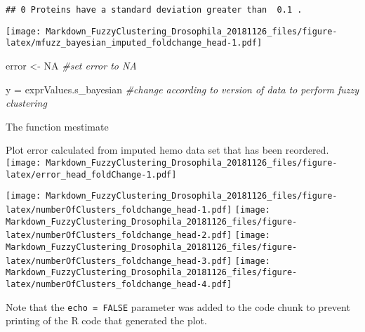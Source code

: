 \documentclass[]{article}
\newenvironment{Shaded}{\begin{snugshade}}{\end{snugshade}}
\newcommand{\KeywordTok}[1]{\textcolor[rgb]{0.13,0.29,0.53}{\textbf{#1}}}
\newcommand{\DataTypeTok}[1]{\textcolor[rgb]{0.13,0.29,0.53}{#1}}
\newcommand{\DecValTok}[1]{\textcolor[rgb]{0.00,0.00,0.81}{#1}}
\newcommand{\StringTok}[1]{\textcolor[rgb]{0.31,0.60,0.02}{#1}}
\newcommand{\CommentTok}[1]{\textcolor[rgb]{0.56,0.35,0.01}{\textit{#1}}}
\newcommand{\OtherTok}[1]{\textcolor[rgb]{0.56,0.35,0.01}{#1}}
\newcommand{\ControlFlowTok}[1]{\textcolor[rgb]{0.13,0.29,0.53}{\textbf{#1}}}
\newcommand{\OperatorTok}[1]{\textcolor[rgb]{0.81,0.36,0.00}{\textbf{#1}}}
\newcommand{\NormalTok}[1]{#1}
\begin{document}
\begin{verbatim}
## 0 Proteins have a standard deviation greater than  0.1 .
\end{verbatim}

\texttt{[image: Markdown\_FuzzyClustering\_Drosophila\_20181126\_files/figure-latex/mfuzz\_bayesian\_imputed\_foldchange\_head-1.pdf]}

\begin{Shaded}
\begin{Highlighting}[]
\NormalTok{error <-}\StringTok{ }\OtherTok{NA} \CommentTok{#set error to NA}

\NormalTok{y =}\StringTok{ }\NormalTok{exprValues.s_bayesian }\CommentTok{#change according to version of data to perform fuzzy clustering}
\end{Highlighting}
\end{Shaded}

The function mestimate

\begin{Shaded}
\end{Shaded}

Plot error calculated from imputed hemo data set that has been
reordered.
\texttt{[image: Markdown\_FuzzyClustering\_Drosophila\_20181126\_files/figure-latex/error\_head\_foldChange-1.pdf]}

\texttt{[image: Markdown\_FuzzyClustering\_Drosophila\_20181126\_files/figure-latex/numberOfClusters\_foldchange\_head-1.pdf]}
\texttt{[image: Markdown\_FuzzyClustering\_Drosophila\_20181126\_files/figure-latex/numberOfClusters\_foldchange\_head-2.pdf]}
\texttt{[image: Markdown\_FuzzyClustering\_Drosophila\_20181126\_files/figure-latex/numberOfClusters\_foldchange\_head-3.pdf]}
\texttt{[image: Markdown\_FuzzyClustering\_Drosophila\_20181126\_files/figure-latex/numberOfClusters\_foldchange\_head-4.pdf]}

Note that the \texttt{echo\ =\ FALSE} parameter was added to the code
chunk to prevent printing of the R code that generated the plot.
\end{document}
